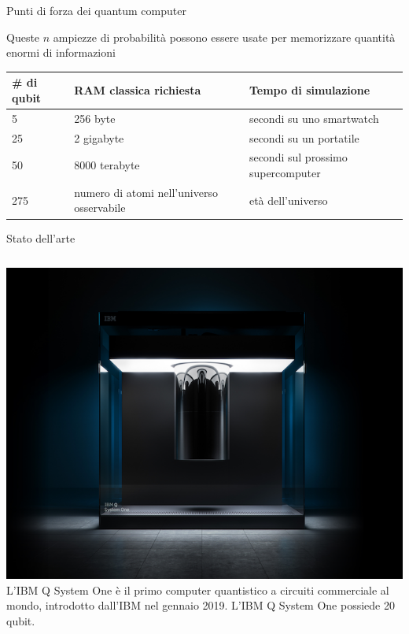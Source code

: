 \documentclass{beamer}
\begin{document}
    \begin{frame}{Punti di forza dei quantum computer}

        Queste $n$ ampiezze di probabilità possono essere usate per memorizzare quantità enormi di informazioni

        \vspace{1cm}

        \begin{tabular}{p{}p{}p{}}
            \# di qubit & RAM classica richiesta & Tempo di simulazione \\ \hline
            5 & 256 byte & secondi su uno smartwatch \\ 
            25 & 2 gigabyte & secondi su un portatile \\ 
            50 & 8000 terabyte & secondi sul prossimo supercomputer \\ 
            275 & numero di atomi nell'universo osservabile & età dell'universo
        \end{tabular}
    \end{frame}

    \begin{frame}{Stato dell'arte}
        \begin{columns}
            \includegraphics[width=\textwidth]{gfx/ibm_q_system_one.png}
            L'IBM Q System One è il primo computer quantistico a circuiti commerciale al mondo, 
            introdotto dall'IBM nel gennaio 2019. L'IBM Q System One possiede 20 qubit. 
        \end{columns}
    \end{frame}
\end{document}
